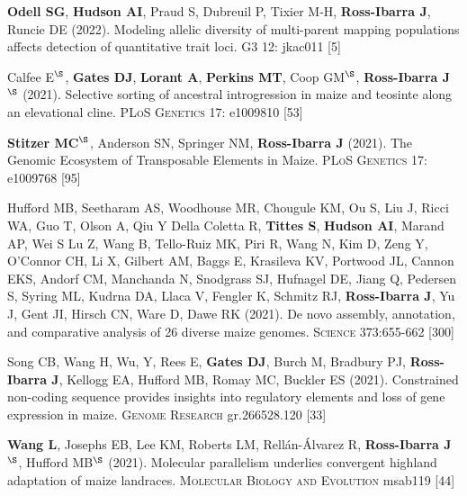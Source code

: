 \documentclass[letterpaper,10pt]{article}
\begin{document}
\begin{etaremune}
\item \textbf{Odell SG}, \textbf{Hudson AI}, Praud S, Dubreuil P, Tixier M-H, \textbf{Ross-Ibarra J}, Runcie DE (2022). Modeling allelic diversity of multi-parent mapping populations affects detection of quantitative trait loci. \textsc{G3} 12: jkac011 %
 [5]\\
\vspace{0.5cm}

\item Calfee E$^\S$, \textbf{Gates DJ}, \textbf{Lorant A}, \textbf{Perkins MT}, Coop GM$^\S$, \textbf{Ross-Ibarra J}$^\S$ (2021). Selective sorting of ancestral introgression in maize and teosinte along an elevational cline. \textsc{PLoS Genetics} 17: e1009810
 [53]\\

\item \textbf{Stitzer MC}$^\S$, Anderson SN, Springer NM, \textbf{Ross-Ibarra J} (2021). The Genomic Ecosystem of Transposable Elements in Maize. \textsc{PLoS Genetics} 17: e1009768
 [95]\\

\item Hufford MB, Seetharam AS, Woodhouse MR, Chougule KM, Ou S, Liu J, Ricci WA, Guo T, Olson A, Qiu Y Della Coletta R, \textbf{Tittes S}, \textbf{Hudson AI},  Marand AP, Wei S Lu Z, Wang B, Tello-Ruiz MK, Piri R, Wang N, Kim D, Zeng Y, O'Connor CH, Li X, Gilbert AM, Baggs E, Krasileva KV, Portwood JL, Cannon EKS, Andorf CM, Manchanda N, Snodgrass SJ, Hufnagel DE, Jiang Q, Pedersen S, Syring ML, Kudrna DA, Llaca V, Fengler K, Schmitz RJ, \textbf{Ross-Ibarra J}, Yu J, Gent JI, Hirsch CN, Ware D, Dawe RK (2021). De novo assembly, annotation, and comparative analysis of 26 diverse maize genomes. \textsc{Science} 373:655-662
 [300]\\

\item Song CB, Wang H, Wu, Y, Rees E, \textbf{Gates DJ}, Burch M,  Bradbury PJ, \textbf{Ross-Ibarra J}, Kellogg EA, Hufford MB, Romay MC, Buckler ES (2021).  Constrained non-coding sequence provides insights into regulatory elements and loss of gene expression in maize. \textsc{Genome Research} gr.266528.120 %
 [33]\\

\item \textbf{Wang L}, Josephs EB, Lee KM, Roberts LM, Rell\'{a}n-\'{A}lvarez R, \textbf{Ross-Ibarra J}$^\S$, Hufford MB$^\S$ (2021). Molecular parallelism underlies convergent highland adaptation of maize landraces. \textsc{Molecular Biology and Evolution} msab119 %
 [44]\\


\end{etaremune}
\end{document}
